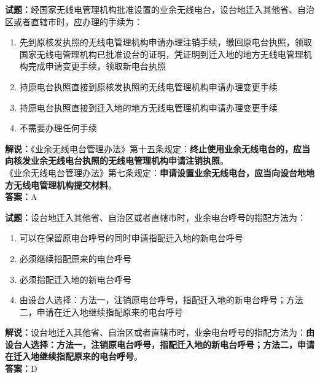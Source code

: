 \documentclass{ctexbook}
\begin{document}
\noindent\textbf{试题：}经国家无线电管理机构批准设置的业余无线电台，设台地迁入其他省、自治区或者直辖市时，应办理的手续为：
\begin{enumerate}[leftmargin=3em]
\item 先到原核发执照的无线电管理机构申请办理注销手续，缴回原电台执照，领取国家无线电管理机构已批准设台的证明，凭证明到迁入地的地方无线电管理机构完成申请变更手续，领取新电台执照
\item 持原电台执照直接到原核发执照的无线电管理机构申请办理变更手续
\item 持原电台执照直接到迁入地的地方无线电管理机构申请办理变更手续
\item 不需要办理任何手续
\end{enumerate}
\noindent\textbf{解说：}《业余无线电台管理办法》第十五条规定：\textbf{终止使用业余无线电台的，应当向核发业余无线电台执照的无线电管理机构申请注销执照}。\\
《业余无线电台管理办法》第七条规定：\textbf{申请设置业余无线电台，应当向设台地地方无线电管理机构提交材料}。\\\noindent\textbf{答案：}A%



\bigskip


\noindent\textbf{试题：}设台地迁入其他省、自治区或者直辖市时，业余电台呼号的指配方法为：
\begin{enumerate}[leftmargin=3em]
\item 可以在保留原电台呼号的同时申请指配迁入地的新电台呼号
\item 必须继续指配原来的电台呼号
\item 必须指配迁入地的新电台呼号
\item 由设台人选择：方法一，注销原电台呼号，指配迁入地的新电台呼号；方法二，申请在迁入地继续指配原来的电台呼号
\end{enumerate}
\noindent\textbf{解说：}设台地迁入其他省、自治区或者直辖市时，业余电台呼号的指配方法为：\textbf{由设台人选择：方法一，注销原电台呼号，指配迁入地的新电台呼号；方法二，申请在迁入地继续指配原来的电台呼号}。\\\noindent\textbf{答案：}D



\bigskip
\end{document}
